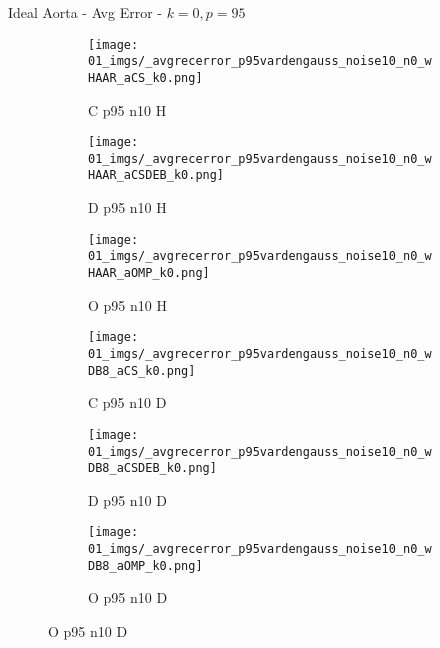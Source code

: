 \begin{frame}{Ideal Aorta - Avg Error - $k=0,p=95$}{}
\begin{figure}
\begin{subfigure}{0.13\textwidth}
\texttt{[image: 01\_imgs/\_avgrecerror\_p95vardengauss\_noise10\_n0\_wHAAR\_aCS\_k0.png]}
\caption*{\tiny C p95 n10 H}
\end{subfigure}
\begin{subfigure}{0.13\textwidth}
\texttt{[image: 01\_imgs/\_avgrecerror\_p95vardengauss\_noise10\_n0\_wHAAR\_aCSDEB\_k0.png]}
\caption*{\tiny D p95 n10 H}
\end{subfigure}
\begin{subfigure}{0.13\textwidth}
\texttt{[image: 01\_imgs/\_avgrecerror\_p95vardengauss\_noise10\_n0\_wHAAR\_aOMP\_k0.png]}
\caption*{\tiny O p95 n10 H}
\end{subfigure}
\begin{subfigure}{0.13\textwidth}
\texttt{[image: 01\_imgs/\_avgrecerror\_p95vardengauss\_noise10\_n0\_wDB8\_aCS\_k0.png]}
\caption*{\tiny C p95 n10 D}
\end{subfigure}
\begin{subfigure}{0.13\textwidth}
\texttt{[image: 01\_imgs/\_avgrecerror\_p95vardengauss\_noise10\_n0\_wDB8\_aCSDEB\_k0.png]}
\caption*{\tiny D p95 n10 D}
\end{subfigure}
\begin{subfigure}{0.13\textwidth}
\texttt{[image: 01\_imgs/\_avgrecerror\_p95vardengauss\_noise10\_n0\_wDB8\_aOMP\_k0.png]}
\caption*{\tiny O p95 n10 D}
\end{subfigure}

\vspace{5pt}


\end{figure}
\end{frame}
